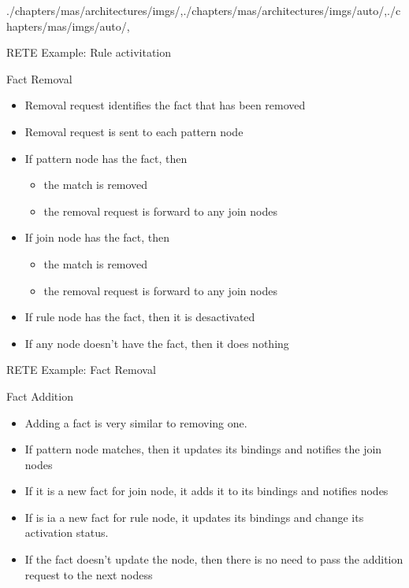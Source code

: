 \begin{graphicspathcontext}{{./chapters/mas/architectures/imgs/},{./chapters/mas/architectures/imgs/auto/},{./chapters/mas/imgs/auto/},\old}
\begin{frame}{{RETE Example:} Rule activitation}
	\centering{}
\end{frame}

\begin{frame}{Fact Removal}
\begin{itemize}
	\item Removal request identifies the fact that has been removed
	\item Removal request is sent to each pattern node
	\item If pattern node has the fact, then \begin{itemize}
		\item the match is removed
		\item the removal request is forward to any join nodes
	\end{itemize}
	\item If join node has the fact, then \begin{itemize}
		\item the match is removed
		\item the removal request is forward to any join nodes
	\end{itemize}
	\item If rule node has the fact, then it is desactivated
	\item If any node doesn't have the fact, then it does nothing
\end{itemize}
\end{frame}

\begin{frame}{{RETE Example:} Fact Removal}
	\centering{}
\end{frame}

\begin{frame}{Fact Addition}
\begin{itemize}
	\item Adding a fact is very similar to removing one.
	\item If pattern node matches, then it updates its bindings and notifies the join nodes
	\item If it is a new fact for join node, it adds it to its bindings and notifies nodes
	\item If is ia a new fact for rule node, it updates its bindings and change its activation status.
	\item If the fact doesn't update the node, then there is no need to pass the addition request to the next nodess
\end{itemize}
\end{frame}


\end{graphicspathcontext}
